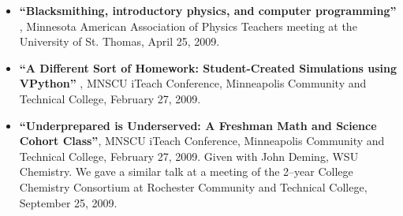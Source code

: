 \documentclass[margin,line,letterpaper]{res}
\begin{document}
\begin{resume}
\begin{itemize}
\item %
\textbf{``Blacksmithing, introductory physics, and computer programming''}
, Minnesota American Association of Physics Teachers meeting at the University of St. Thomas, April 25, 2009.
%
%

\item 
\textbf{``A Different Sort of Homework: Student-Created Simulations using VPython''}
, MNSCU iTeach Conference, Minneapolis Community and Technical College, February 27, 2009.
%


\item \textbf{``Underprepared is Underserved: A Freshman Math and Science Cohort Class''}, 
MNSCU iTeach Conference, Minneapolis Community and Technical College, February 27, 2009.
Given with John Deming, WSU Chemistry.  We gave a similar talk at a meeting of the 2--year College Chemistry Consortium at Rochester Community and Technical College, September 25, 2009.
%



\end{itemize}
\end{resume}
\end{document}
